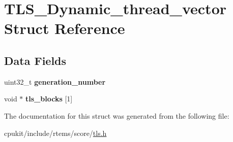 \hypertarget{structTLS__Dynamic__thread__vector}{}\section{T\+L\+S\+\_\+\+Dynamic\+\_\+thread\+\_\+vector Struct Reference}
\label{structTLS__Dynamic__thread__vector}
\subsection*{Data Fields}
\begin{DoxyCompactItemize}
\item 
\mbox{\label{structTLS__Dynamic__thread__vector_abb651d175b66a0f0ddd4bc7b8a1ea98e}} 
uint32\+\_\+t {\bfseries generation\+\_\+number}
\item 
\mbox{\label{structTLS__Dynamic__thread__vector_a0f90962f809f12657729930e92c48f40}} 
void $\ast$ {\bfseries tls\+\_\+blocks} \mbox{[}1\mbox{]}
\end{DoxyCompactItemize}


The documentation for this struct was generated from the following file\+:\begin{DoxyCompactItemize}
\item 
cpukit/include/rtems/score/\mbox{\hyperlink{tls_8h}{tls.\+h}}\end{DoxyCompactItemize}
